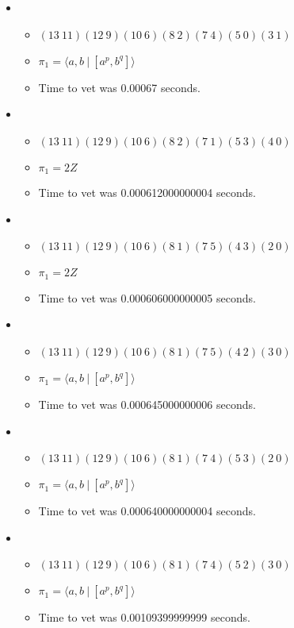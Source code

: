 \documentclass{article}
\begin{document}
\begin{itemize}
\item \begin{itemize}
      \item $(13\ 11)(12\ 9)(10\ 6)(8\ 2)(7\ 4)(5\ 0)(3\ 1)$
      \item $\pi_1 = \langle a,b\ |\ [a^p,b^q]\rangle$
      \item Time to vet was 0.00067 seconds.
\end{itemize}
\item \begin{itemize}
      \item $(13\ 11)(12\ 9)(10\ 6)(8\ 2)(7\ 1)(5\ 3)(4\ 0)$
      \item $\pi_1 =2 Z$
      \item Time to vet was 0.000612000000004 seconds.
\end{itemize}
\item \begin{itemize}
      \item $(13\ 11)(12\ 9)(10\ 6)(8\ 1)(7\ 5)(4\ 3)(2\ 0)$
      \item $\pi_1 =2 Z$
      \item Time to vet was 0.000606000000005 seconds.
\end{itemize}
\item \begin{itemize}
      \item $(13\ 11)(12\ 9)(10\ 6)(8\ 1)(7\ 5)(4\ 2)(3\ 0)$
      \item $\pi_1 = \langle a,b\ |\ [a^p,b^q]\rangle$
      \item Time to vet was 0.000645000000006 seconds.
\end{itemize}
\item \begin{itemize}
      \item $(13\ 11)(12\ 9)(10\ 6)(8\ 1)(7\ 4)(5\ 3)(2\ 0)$
      \item $\pi_1 = \langle a,b\ |\ [a^p,b^q]\rangle$
      \item Time to vet was 0.000640000000004 seconds.
\end{itemize}
\item \begin{itemize}
      \item $(13\ 11)(12\ 9)(10\ 6)(8\ 1)(7\ 4)(5\ 2)(3\ 0)$
      \item $\pi_1 = \langle a,b\ |\ [a^p,b^q]\rangle$
      \item Time to vet was 0.00109399999999 seconds.
\end{itemize}

\end{itemize}
\end{document}
